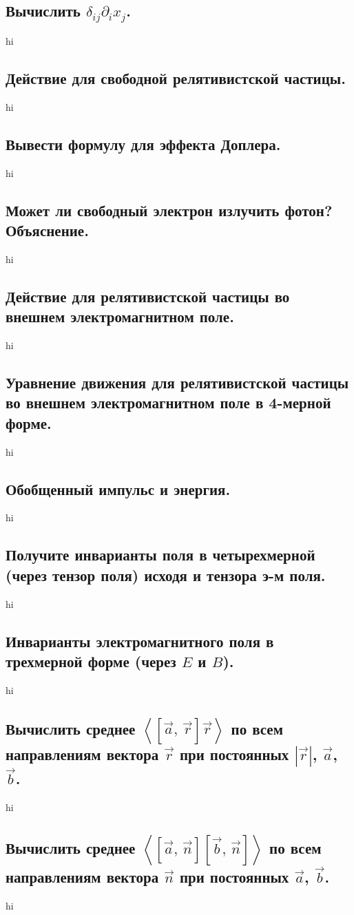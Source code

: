 \documentclass[a4paper,12pt]{article}
\begin{document}
\subsection{Вычислить $\delta_{ij}\partial_i x_j$.}
hi
\subsection{Действие для свободной релятивистской частицы.}
hi
\subsection{Вывести формулу для эффекта Доплера.}
hi
\subsection{Может ли свободный электрон излучить фотон? Объяснение.}
hi
\subsection{Действие для релятивистской частицы во внешнем электромагнитном
поле.}
hi
\subsection{Уравнение движения для релятивистской частицы во внешнем
электромагнитном поле в 4-мерной форме.}
hi
\subsection{Обобщенный импульс и энергия.}
hi
\subsection{Получите инварианты поля в четырехмерной (через тензор поля)
исходя и тензора э-м поля.}
hi
\subsection{Инварианты электромагнитного поля в трехмерной форме (через $E$ и
$B$).}
hi
\subsection{Вычислить среднее $\left<\left[ \vec{a},\,\vec{r} \right] \vec{r}
\right>$ по всем направлениям вектора $\vec{r}$ при постоянных  $\left| 
\vec{r}\right| $, $\vec{a}$, $\vec{b}$.}
hi
\subsection{Вычислить среднее $\left<\left[ \vec{a},\,\vec{n} \right]
\left[ \vec{b},\,\vec{n} \right]
\right>$ по всем направлениям вектора $\vec{n}$ при постоянных 
$\vec{a}$, $\vec{b}$.}
hi
\end{document}
